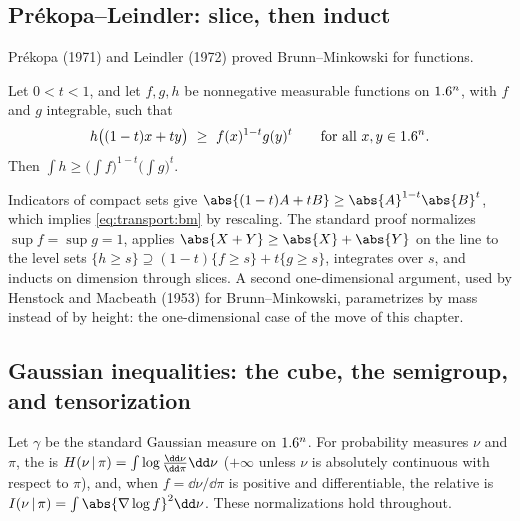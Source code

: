 \begin{refsection}
\subsection{Pr\'ekopa--Leindler: slice, then induct}\label{sec:transport:plbefore}

Pr\'ekopa (1971) and Leindler (1972) proved Brunn--Minkowski for functions.

\begin{theorem}\label{thm:transport:pl}
Let $0<t<1$, and let $f,g,h$ be nonnegative measurable functions on $1.6^n$, with $f$ and $g$ integrable, such that
\begin{equation}\label{eq:transport:plhyp}
h\bigl((1-t)x+ty\bigr)\ \ge\ f(x)^{1-t}g(y)^{t}\qquad\text{for all } x,y\in1.6^n.
\end{equation}
Then $\int h\ge\bigl(\int f\bigr)^{1-t}\bigl(\int g\bigr)^{t}$.
\end{theorem}

Indicators of compact sets give $\abs{(1-t)A+tB}\ge\abs{A}^{1-t}\abs{B}^{t}$, which implies \eqref{eq:transport:bm} by rescaling. The standard proof normalizes $\sup f=\sup g=1$, applies $\abs{X+Y}\ge\abs{X}+\abs{Y}$ on the line to the level sets $\{h\ge s\}\supseteq(1-t)\{f\ge s\}+t\{g\ge s\}$, integrates over $s$, and inducts on dimension through slices. A second one-dimensional argument, used by Henstock and Macbeath (1953) for Brunn--Minkowski, parametrizes by mass instead of by height: the one-dimensional case of the move of this chapter.

\subsection{Gaussian inequalities: the cube, the semigroup, and tensorization}\label{sec:transport:gaussbefore}

Let $\gamma$ be the standard Gaussian measure on $1.6^n$. For probability measures $\nu$ and $\pi$, the  is $\transportH{\nu}{\pi}=\int\log\frac{\dd\nu}{\dd\pi}\dd\nu$ ($+\infty$ unless $\nu$ is absolutely continuous with respect to $\pi$), and, when $f=\dd\nu/\dd\pi$ is positive and differentiable, the relative  is $\transportI{\nu}{\pi}=\int\abs{\nabla\log f}^2\dd\nu$. These normalizations hold throughout.


\end{refsection}
